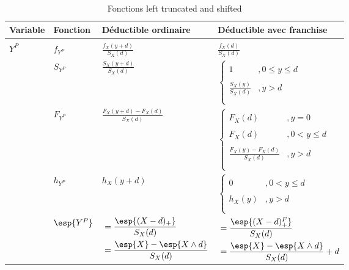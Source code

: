 \documentclass[french, landscape]{article}
\begin{document}
\twocolumn
\begin{table}
    \begin{tabular}{|l|l|l|l|}
        \hline
        Variable & Fonction    & Déductible ordinaire                        & Déductible avec franchise                                                                                            		\\ \hline
        \\$Y^P$    & $f_{Y^P}$   & $\frac{f_X(y+d)}{S_X(d)}$                   & $\frac{f_X(d)}{S_X(d)}$                                                                                                	\\ 
        ~        & $S_{Y^P}$   & $\frac{S_X(y+d)}{S_X(d)}$                   & $\begin{cases} \\ 1	 		 &  , 0 \leq y \leq d 	\\ \\ \frac{S_X(y)}{S_X(d)}	 	&  , y > d			\\ \\ \end{cases}$          \\ 
        ~        & $F_{Y^P}$   & $\frac{F_X(y+d) - F_X(d)}{S_X(d)}$          & $\begin{cases} \\ F_X(d)	 &  , y = 0 				\\ \\ F_X(d)	 					&  , 0 < y \leq d 	\\ \\ \frac{F_X(y) - F_X(d)}{S_X(d)}	 &  , y > d \\ \\ \end{cases}$ \\ 
        ~        & $h_{Y^P}$   & $h_X(y+d)$                                  & $\begin{cases} \\ 0		 	 &  , 0 < y \leq d 		\\ \\ h_X(y)	 					&  , y > d 			\\ \\ \end{cases}$                              	\\ 
        ~        & $\esp{Y^P}$ & $\begin{aligned}
        &= \frac{\esp{(X - d)_+}}{S_X(d)} \\
        &= \frac{\esp{X} - \esp{X \wedge d}}{S_X(d)}
        \end{aligned}$ & $\begin{aligned}
        &= \frac{\esp{(X-d)_+^F}}{S_X(d)} \\
        &= \frac{\esp{X} - \esp{X \wedge d}}{S_X(d)} + d
        \end{aligned}$                                                      	\\ 
        \hline
    \end{tabular}
    \caption{Fonctions left truncated and shifted}
\end{table}
\end{document}
